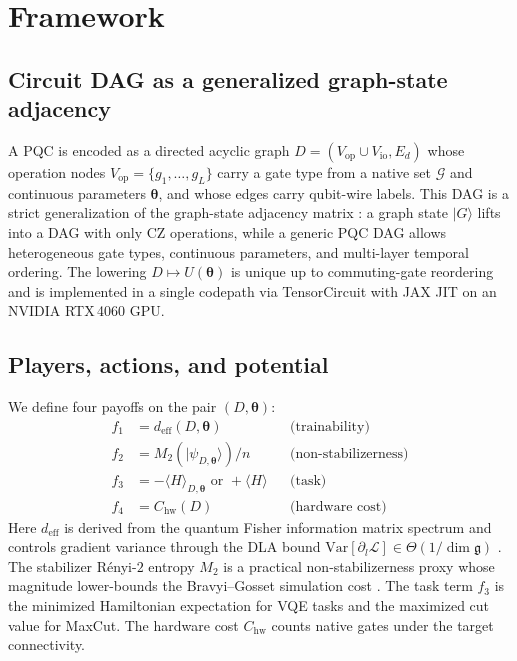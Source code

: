 \documentclass[a4paper,onecolumn,noarxiv]{quantumarticle}
\begin{document}
\section{Framework}
\label{sec:framework}

\subsection{Circuit DAG as a generalized graph-state adjacency}

A PQC is encoded as a directed acyclic graph $D=(V_\text{op}\cup V_\text{io},E_d)$ whose operation nodes $V_\text{op}=\{g_1,\ldots,g_L\}$ carry a gate type from a native set $\mathcal G$ and continuous parameters $\bm\theta$, and whose edges carry qubit-wire labels. This DAG is a strict generalization of the graph-state adjacency matrix \cite{hein2004graphstates,raussendorf2001oneway}: a graph state $|G\rangle$ lifts into a DAG with only CZ operations, while a generic PQC DAG allows heterogeneous gate types, continuous parameters, and multi-layer temporal ordering. The lowering $D\mapsto U(\bm\theta)$ is unique up to commuting-gate reordering and is implemented in a single codepath via TensorCircuit \cite{zhang2023tensorcircuit} with JAX JIT on an NVIDIA RTX\,4060 GPU.

\subsection{Players, actions, and potential}

We define four payoffs on the pair $(D,\bm\theta)$:
\begin{align}
f_1 &= d_\text{eff}(D,\bm\theta) & &\text{(trainability)}\nonumber\\
f_2 &= M_2(|\psi_{D,\bm\theta}\rangle)/n & &\text{(non-stabilizerness)}\label{eq:players}\\
f_3 &= -\langle H\rangle_{D,\bm\theta}\text{ or }+\langle H\rangle & &\text{(task)}\nonumber\\
f_4 &= C_\text{hw}(D) & &\text{(hardware cost)}\nonumber
\end{align}
Here $d_\text{eff}$ is derived from the quantum Fisher information matrix spectrum and controls gradient variance through the DLA bound $\mathrm{Var}[\partial_l\mathcal L]\in\Theta(1/\dim\mathfrak g)$ \cite{ragone2024lie}. The stabilizer R\'enyi-$2$ entropy $M_2$ \cite{leone2022stabilizer} is a practical non-stabilizerness proxy whose magnitude lower-bounds the Bravyi--Gosset simulation cost \cite{bravyi2016trading}. The task term $f_3$ is the minimized Hamiltonian expectation for VQE tasks and the maximized cut value for MaxCut. The hardware cost $C_\text{hw}$ counts native gates under the target connectivity.
\end{document}
